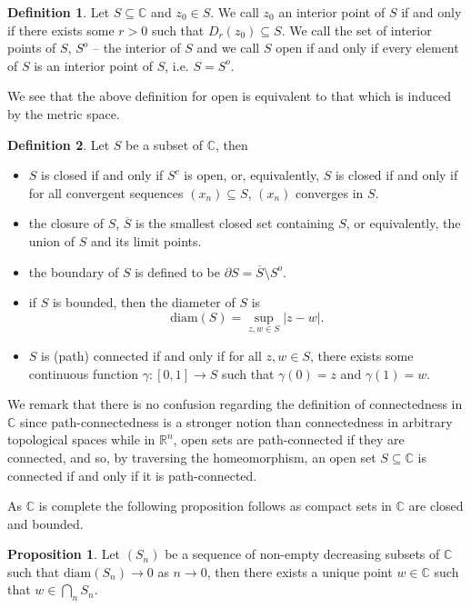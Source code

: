 \documentclass[
]{article}
\theoremstyle{definition}
\newtheorem{prop}{Proposition}
\theoremstyle{definition}
\newtheorem{definition}{Definition}[section]
\begin{document}
\begin{definition}
  Let \(S \subseteq \mathbb{C}\) and \(z_0 \in S\). We call \(z_0\) an interior 
  point of \(S\) if and only if there exists some \(r > 0\) such that 
  \(D_r(z_0) \subseteq S\). We call the set of interior points of \(S\), \(S^o\) 
  -- the interior of \(S\) and we call \(S\) open if and only if every element of \(S\) 
  is an interior point of \(S\), i.e. \(S = S^o\). 
\end{definition}

We see that the above definition for open is equivalent to that which is
induced by the metric space.

\begin{definition}
  Let \(S\) be a subset of \(\mathbb{C}\), then
  \begin{itemize}
    \item \(S\) is closed if and only if \(S^c\) is open, or, 
      equivalently, \(S\) is closed if and only if for all convergent sequences 
      \((x_n) \subseteq S\), \((x_n)\) converges in \(S\).
    \item the closure of \(S\), \(\overline{S}\) is the smallest closed set 
      containing \(S\), or equivalently, the union of \(S\) and its limit points.
    \item the boundary of \(S\) is defined to be \(\partial S = 
      \overline{S} \setminus S^o\).
    \item if \(S\) is bounded, then the diameter of \(S\) is 
      \[\text{diam}(S) = \sup_{z, w \in S} \left| z - w \right|.\]
    \item \(S\) is (path) connected if and only if for all \(z, w \in S\), there exists 
      some continuous function \(\gamma : [0, 1] \to S\) such that \(\gamma(0) = z\) 
      and \(\gamma(1) = w\).
  \end{itemize}
\end{definition}

We remark that there is no confusion regarding the definition of
connectedness in \(\mathbb{C}\) since path-connectedness is a stronger
notion than connectedness in arbitrary topological spaces while in
\(\mathbb{R}^n\), open sets are path-connected if they are connected,
and so, by traversing the homeomorphism, an open set
\(S \subseteq \mathbb{C}\) is connected if and only if it is
path-connected.

As \(\mathbb{C}\) is complete the following proposition follows as
compact sets in \(\mathbb{C}\) are closed and bounded.

\begin{prop}
  Let \((S_n)\) be a sequence of non-empty decreasing subsets of \(\mathbb{C}\) 
  such that \(\text{diam}(S_n) \to 0\) as \(n \to 0\), then there exists a unique 
  point \(w \in \mathbb{C}\) such that \(w \in \bigcap_n S_n\).
\end{prop}
\proof
\end{document}
